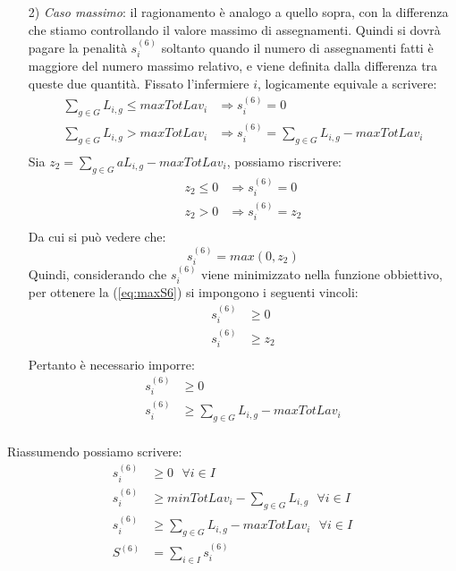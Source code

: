 \begin{itemize}
\item [2)] \textit{Caso massimo}: il ragionamento è analogo a quello sopra, con la differenza che stiamo controllando il valore massimo di assegnamenti. Quindi si dovrà pagare la penalità $s^{(6)}_{i}$ soltanto quando il numero di assegnamenti fatti è maggiore del numero massimo relativo, e viene definita dalla differenza tra queste due quantità. Fissato l'infermiere $i$, logicamente equivale a scrivere:
\begin{equation}
\begin{split}
\sum_{g \in G} L_{i, g} \leq maxTotLav_i &\Longrightarrow s^{(6)}_{i} = 0\\
\sum_{g \in G} L_{i, g} > maxTotLav_i &\Longrightarrow s^{(6)}_{i} = \sum_{g \in G} L_{i, g} - maxTotLav_i\\
\end{split}
\end{equation}
Sia $z_2 = \sum_{g \in G} aL_{i, g} - maxTotLav_i$, possiamo riscrivere:
\begin{equation}
\begin{split}
z_2 \leq 0 &\Longrightarrow s^{(6)}_{i} = 0 \\
z_2 > 0 &\Longrightarrow s^{(6)}_{i} = z_2 \\
\end{split}
\end{equation}
Da cui si può vedere che:
\begin{equation}
\label{eq:maxS6}
s^{(6)}_{i} = max(0, z_2)
\end{equation}
Quindi, considerando che $s^{(6)}_{i}$ viene minimizzato nella funzione obbiettivo, per ottenere la (\ref{eq:maxS6}) si impongono i seguenti vincoli:
\begin{equation}
\begin{split}
s^{(6)}_{i} &\geq 0 \\
s^{(6)}_{i} &\geq z_2 \\
\end{split}
\end{equation}
Pertanto è necessario imporre:
\begin{equation}
\begin{split}
s^{(6)}_{i} &\geq 0 \\
s^{(6)}_{i} &\geq \sum_{g \in G} L_{i, g} - maxTotLav_i \\
\end{split}
\end{equation}
\end{itemize}

Riassumendo possiamo scrivere:
\begin{equation}
\begin{split}
s^{(6)}_{i} &\geq 0 ~~~ \forall i \in I \\
s^{(6)}_{i} &\geq minTotLav_i - \sum_{g \in G} L_{i, g} ~~~ \forall i \in I \\
s^{(6)}_{i} &\geq \sum_{g \in G} L_{i, g} - maxTotLav_i  ~~~ \forall i \in I \\
S^{(6)} &= \sum_{i \in I} s^{(6)}_{i}
\end{split}
\end{equation}


